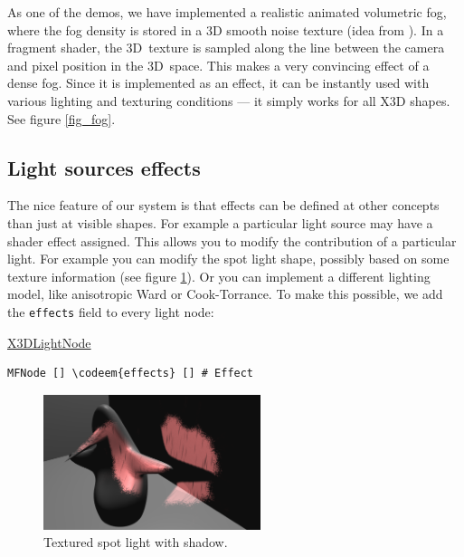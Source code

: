 \documentclass{egpubl}
\newenvironment{mycode}
{\begin{mycodecore}}
{\end{mycodecore}
\vspace{-0.1in}}
\newcommand*{\codeem}[1]{\textbf{#1}}
\begin{document}
As one of the demos, we have implemented a realistic
animated volumetric fog, where the fog density is stored in
a 3D smooth noise texture (idea from \cite{humus:volumetricfog}).
In a fragment shader, the 3D~texture is sampled
along the line between the camera and pixel position in the 3D~space. This makes a very
convincing effect of a dense fog. Since it is implemented as an effect,
it can be instantly used with various lighting and texturing conditions
--- it simply works for all X3D shapes. See figure \ref{fig_fog}.

\subsection{Light sources effects}

The nice feature of our system is that effects can be defined at other
concepts than just at visible shapes. For example a particular light source
may have a shader effect assigned.
This allows you to modify the contribution of a particular light.
For example you can modify the spot light shape, possibly
based on some texture information (see figure \ref{fig_fancy_spot}).
Or you can implement a different lighting model, like anisotropic Ward
or Cook-Torrance.
To make this possible, we add the \texttt{effects} field to every light node:

\begin{mycode}
\underline{X3DLightNode}
\begin{Verbatim}[commandchars=\\\{\}]
MFNode [] \codeem{effects} [] # Effect
\end{Verbatim}
\end{mycode}

\begin{figure}[H]
  \centering
  \includegraphics[width=2.5in]{fancy_light_spot_shape-cropped}
  \caption{Textured spot light with shadow.}
  \label{fig_fancy_spot}
\end{figure}

\end{document}
